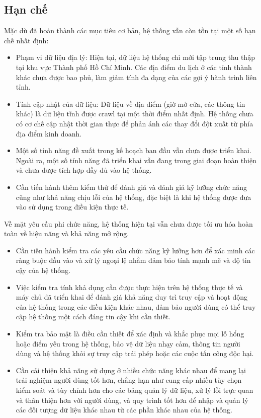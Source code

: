 \subsection{Hạn chế}
Mặc dù đã hoàn thành các mục tiêu cơ bản, hệ thống vẫn còn tồn tại một số hạn chế nhất định:
\begin{itemize} 
    \item Phạm vi dữ liệu địa lý: Hiện tại, dữ liệu hệ thống chỉ mới tập trung thu thập tại khu vực Thành phố Hồ Chí Minh. Các địa điểm du lịch ở các tỉnh thành khác chưa được bao phủ, làm giảm tính đa dạng của các gợi ý hành trình liên tỉnh.
    \item Tính cập nhật của dữ liệu: Dữ liệu về địa điểm (giờ mở cửa, các thông tin khác) là dữ liệu tĩnh được crawl tại một thời điểm nhất định. Hệ thống chưa có cơ chế cập nhật thời gian thực để phản ánh các thay đổi đột xuất từ phía địa điểm kinh doanh.
    \item Một số tính năng đề xuất trong kế hoạch ban đầu vẫn chưa được triển khai. Ngoài ra, một số tính năng đã triển khai vẫn đang trong giai đoạn hoàn thiện và chưa được tích hợp đầy đủ vào hệ thống.
    \item Cần tiến hành thêm kiểm thử để đánh giá và đánh giá kỹ lưỡng chức năng cũng như khả năng chịu lỗi của hệ thống, đặc biệt là khi hệ thống được đưa vào sử dụng trong điều kiện thực tế.
\end{itemize}

Về mặt yêu cầu phi chức năng, hệ thống hiện tại vẫn chưa được tối ưu hóa hoàn toàn về hiệu năng và khả năng mở rộng. 
\begin{itemize}
    \item Cần tiến hành kiểm tra các yêu cầu chức năng kỹ lưỡng hơn để xác minh các ràng buộc đầu vào và xử lý ngoại lệ nhằm đảm bảo tính mạnh mẽ và độ tin cậy của hệ thống.
    \item Việc kiểm tra tính khả dụng cần được thực hiện trên hệ thống thực tế và máy chủ đã triển khai để đánh giá khả năng duy trì truy cập và hoạt động của hệ thống trong các điều kiện khác nhau, đảm bảo người dùng có thể truy cập hệ thống một cách đáng tin cậy khi cần thiết.
    \item Kiểm tra bảo mật là điều cần thiết để xác định và khắc phục mọi lỗ hổng hoặc điểm yếu trong hệ thống, bảo vệ dữ liệu nhạy cảm, thông tin người dùng và hệ thống khỏi sự truy cập trái phép hoặc các cuộc tấn công độc hại.
    \item Cần cải thiện khả năng sử dụng ở nhiều chức năng khác nhau để mang lại trải nghiệm người dùng tốt hơn, chẳng hạn như cung cấp nhiều tùy chọn kiểm soát và tùy chỉnh hơn cho các bảng quản lý dữ liệu, xử lý lỗi trực quan và thân thiện hơn với người dùng, và quy trình tốt hơn để nhập và quản lý các đối tượng dữ liệu khác nhau từ các phần khác nhau của hệ thống.
\end{itemize}

